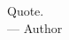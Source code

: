 \thispagestyle{empty}

\vspace*{3cm}

\begin{center}
    Quote. \\ \medskip
    --- Author
\end{center}
